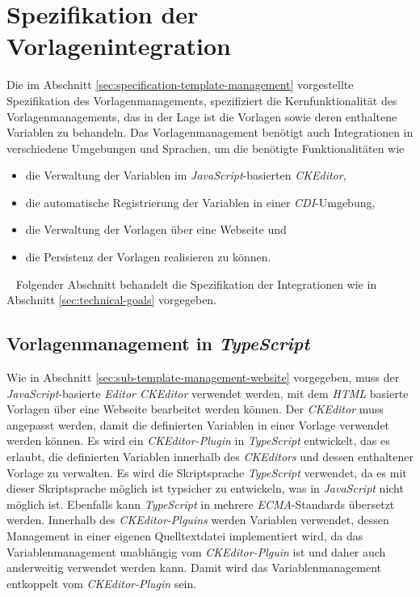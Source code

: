 \section{Spezifikation der Vorlagenintegration}
Die im Abschnitt \ref{sec:specification-template-management} vorgestellte Spezifikation des Vorlagenmanagements, spezifiziert die Kernfunktionalität des Vorlagenmanagements, das in der Lage ist die Vorlagen sowie deren enthaltene Variablen zu behandeln. Das Vorlagenmanagement benötigt auch Integrationen in verschiedene Umgebungen und Sprachen, um die benötigte Funktionalitäten wie
\begin{itemize}
	\item die Verwaltung der Variablen im  \emph{JavaScript}-basierten \emph{CKEditor},
	\item die automatische Registrierung der Variablen in einer \emph{CDI}-Umgebung,
	\item die Verwaltung der Vorlagen über eine Webseite und
	\item die Persistenz der Vorlagen realisieren zu können. 
\end{itemize}
\ \newline
Folgender Abschnitt behandelt die Spezifikation der Integrationen wie in Abschnitt \ref{sec:technical-goals} vorgegeben. 
 
\subsection{Vorlagenmanagement in \emph{TypeScript}}
\label{sec:sub-typescript-javascript}
Wie in Abschnitt \ref{sec:sub-template-management-website} vorgegeben, muss der \emph{JavaScript}-basierte \emph{Editor CKEditor} verwendet werden, mit dem \emph{HTML} basierte Vorlagen über eine Webseite bearbeitet werden können. Der \emph{CKEditor} muss angepasst werden, damit die definierten Variablen in einer Vorlage verwendet werden können. Es wird ein \emph{CKEditor-Plugin} in \emph{TypeScript} entwickelt, das es erlaubt, die definierten Variablen innerhalb des \emph{CKEditors} und dessen enthaltener Vorlage zu verwalten. Es wird die Skriptsprache \emph{TypeScript} verwendet, da es mit dieser Skriptsprache möglich ist typsicher zu entwickeln, was in \emph{JavaScript} nicht möglich ist. Ebenfalls kann \emph{TypeScript} in mehrere \emph{ECMA}-Standards übersetzt werden.
\newline
\newline
Innerhalb des \emph{CKEditor-Plguins} werden Variablen verwendet, dessen Management in einer eigenen Quelltextdatei implementiert wird, da das Variablenmanagement unabhängig vom \emph{CKEditor-Plguin} ist und daher auch anderweitig verwendet werden kann. Damit wird das Variablenmanagement entkoppelt vom \emph{CKEditor-Plugin} sein.

